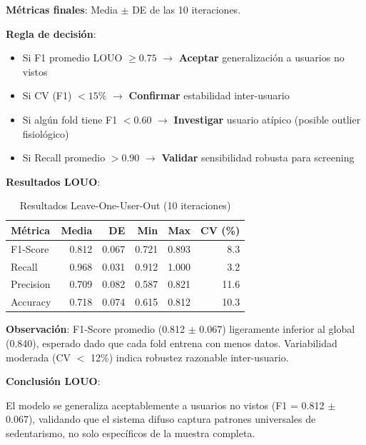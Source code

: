 \documentclass[12pt,letterpaper,twoside]{report}
\begin{document}
\begin{calculobox}
\begin{estadisticobox}
\textbf{Métricas finales}: Media $\pm$ DE de las 10 iteraciones.
\end{estadisticobox}

\begin{reglabox}
\textbf{Regla de decisión}:

\begin{itemize}[noitemsep]
    \item Si F1 promedio LOUO $\geq 0.75$ $\to$ \textbf{Aceptar} generalización a usuarios no vistos
    \item Si CV (F1) $< 15\%$ $\to$ \textbf{Confirmar} estabilidad inter-usuario
    \item Si algún fold tiene F1 $< 0.60$ $\to$ \textbf{Investigar} usuario atípico (posible outlier fisiológico)
    \item Si Recall promedio $> 0.90$ $\to$ \textbf{Validar} sensibilidad robusta para screening
\end{itemize}
\end{reglabox}

\begin{calculobox}
\textbf{Resultados LOUO}:

\begin{table}[H]
\centering
\caption{Resultados Leave-One-User-Out (10 iteraciones)}
\label{tab:louo_results}
\begin{tabular}{@{}lrrrrr@{}}
\toprule
\textbf{Métrica} & \textbf{Media} & \textbf{DE} & \textbf{Min} & \textbf{Max} & \textbf{CV (\%)} \\
\midrule
F1-Score         & 0.812 & 0.067 & 0.721 & 0.893 & 8.3 \\
Recall           & 0.968 & 0.031 & 0.912 & 1.000 & 3.2 \\
Precision        & 0.709 & 0.082 & 0.587 & 0.821 & 11.6 \\
Accuracy         & 0.718 & 0.074 & 0.615 & 0.812 & 10.3 \\
\bottomrule
\end{tabular}
\end{table}

\textbf{Observación}: F1-Score promedio (0.812 $\pm$ 0.067) ligeramente inferior al global (0.840), esperado dado que cada fold entrena con menos datos. Variabilidad moderada (CV $<$ 12\%) indica robustez razonable inter-usuario.
\end{calculobox}

\begin{decisionbox}
\textbf{Conclusión LOUO}:

El modelo se generaliza aceptablemente a usuarios no vistos (F1 = 0.812 $\pm$ 0.067), validando que el sistema difuso captura patrones universales de sedentarismo, no solo específicos de la muestra completa.
\end{decisionbox}


\end{calculobox}
\end{document}
